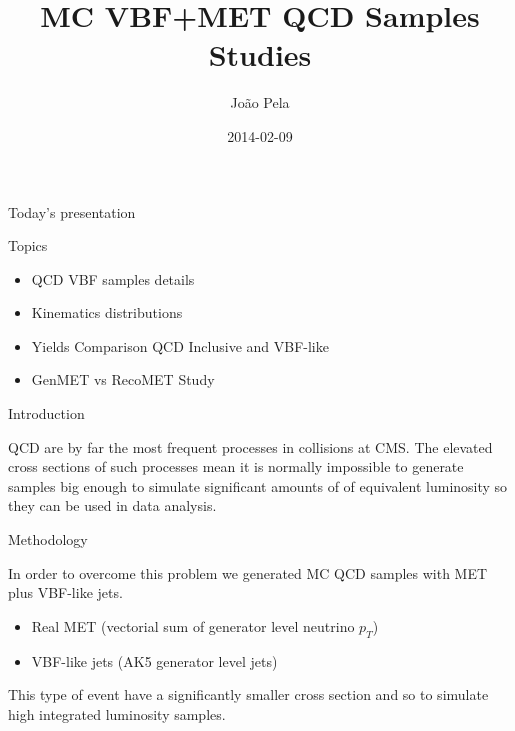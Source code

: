\documentclass[8pt]{beamer}
\author[J. Pela]{João Pela}
\title[MC VBF QCD]{MC VBF+MET QCD Samples Studies}
\institute[ICL]{Imperial College London}
\date{2014-02-09}
\begin{document}
\setlength{\unitlength}{1mm}

\begin{frame}
  \titlepage
\end{frame}

\begin{frame}{Today's presentation}
 
\begin{block}{Topics}
 
\begin{itemize}
  \item QCD VBF samples details
  \item Kinematics distributions
  \item Yields Comparison QCD Inclusive and VBF-like
  \item GenMET vs RecoMET Study
\end{itemize}
 
\end{block}

\end{frame}

\begin{frame}{Introduction}


QCD are by far the most frequent processes in collisions at CMS. The elevated cross sections of such processes mean it is normally impossible to generate samples big enough to simulate 
significant amounts of of equivalent luminosity so they can be used in data analysis.

\begin{block}{Methodology}

In order to overcome this problem we generated MC QCD samples with MET plus VBF-like jets.
\begin{itemize}
  \item Real MET (vectorial sum of generator level neutrino $p_T$)
  \item VBF-like jets (AK5 generator level jets)
\end{itemize}

\end{block}

This type of event have a significantly smaller cross section and so to simulate high integrated luminosity samples. 
 
\end{frame}
\end{document}
